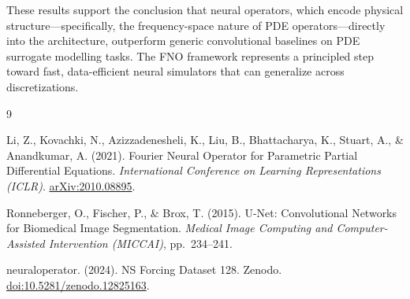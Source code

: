 \documentclass[11pt,twocolumn]{article}
\begin{document}
These results support the conclusion that neural operators, which encode physical
structure---specifically, the frequency-space nature of PDE operators---directly
into the architecture, outperform generic convolutional baselines on PDE surrogate
modelling tasks.
The FNO framework represents a principled step toward fast, data-efficient neural
simulators that can generalize across discretizations.


\begin{thebibliography}{9}

Li, Z., Kovachki, N., Azizzadenesheli, K., Liu, B., Bhattacharya, K., Stuart, A.,
  \& Anandkumar, A. (2021).
\newblock Fourier Neural Operator for Parametric Partial Differential Equations.
\newblock \emph{International Conference on Learning Representations (ICLR)}.
\newblock \href{https://arxiv.org/abs/2010.08895}{arXiv:2010.08895}.

Ronneberger, O., Fischer, P., \& Brox, T. (2015).
\newblock U-Net: Convolutional Networks for Biomedical Image Segmentation.
\newblock \emph{Medical Image Computing and Computer-Assisted Intervention
  (MICCAI)}, pp.\ 234--241.

neuraloperator. (2024).
\newblock NS Forcing Dataset 128.
\newblock Zenodo.
\newblock \href{https://doi.org/10.5281/zenodo.12825163}{doi:10.5281/zenodo.12825163}.

\end{thebibliography}
\end{document}
